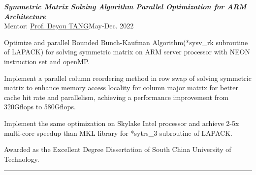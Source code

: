 \documentclass[10pt]{article}
\newenvironment{outerlist}[1][\enskip\textbullet]%
        {%
        \begin{itemize}[label=#1, itemsep=1pt]}{\end{itemize}%
         \vspace{-0.6\baselineskip}}
\newenvironment{innerlist}[1][\enskip$\circ$]%
        {\begin{compactitem}[#1]}{\end{compactitem}}
\begin{document}
\begin{outerlist}
\item {\it\textbf{Symmetric Matrix Solving Algorithm Parallel Optimization for ARM Architecture}}\\
Mentor: \href{http://www2.scut.edu.cn/sse/2018/0614/c16789a270678/page.htm}{Prof. Deyou TANG}\hfill May-Dec. 2022\\
\vspace{-0.2in}
\begin{innerlist}
        \item Optimize and parallel Bounded Bunch-Kaufman Algorithm(*sysv\_rk subroutine of LAPACK) for solving symmetric matrix on ARM server processor with NEON instruction set and openMP.
        \item Implement a parallel column reordering method in row swap of solving symmetric matrix to enhance memory access locality for column major matrix for better cache hit rate and parallelism, achieving a performance improvement from 320Gflops to 580Gflops.
        \item Implement the same optimization on Skylake Intel processor and achieve 2-5x multi-core speedup than MKL library for *sytrs\_3 subroutine of LAPACK.
        \item Awarded as the Excellent Degree Dissertation of South China University of Technology.
\end{innerlist}




\end{outerlist}

 \noindent\rule{\textwidth}{1pt}
\end{document}
